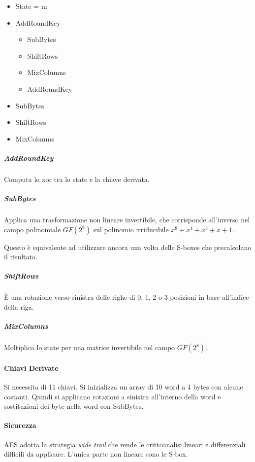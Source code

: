 \begin{itemize}
  \item State = m
  \item AddRoundKey
  \begin{itemize}
  \item SubBytes
  \item ShiftRows
  \item MixColumns
  \item AddRoundKey
  \end{itemize}
  \item SubBytes
  \item ShiftRows
  \item MixColumns
\end{itemize}

\subparagraph{AddRoundKey}

Computa lo xor tra lo state e la chiave derivata.

\subparagraph{SubBytes}

Applica una trasformazione non lineare invertibile, che corrisponde all'inverso nel campo polinomiale $GF(2^8)$ sul polinomio irriducibile $x^8+x^4+x^3+x+1$.

Questo \`e equivalente ad utilizzare ancora una volta delle S-boxes che precalcolano il risultato.

\subparagraph{ShiftRows}

\`E una rotazione verso sinistra delle righe di 0, 1, 2 o 3 posizioni in base all'indice della riga.

\subparagraph{MixColumns}

Moltiplica lo state per una matrice invertibile nel campo $GF(2^8)$.

\paragraph{Chiavi Derivate}

Si necessita di 11 chiavi. Si inizializza un array di 10 word a 4 bytes con alcune costanti. Quindi si applicano rotazioni a sinistra all'interno della word e sostituzioni dei byte nella word con SubBytes.

\paragraph{Sicurezza}

AES adotta la strategia \textit{wide trail} che rende le crittoanalisi lineari e differenziali difficili da applicare. L'unica parte non lineare sono le S-box.
